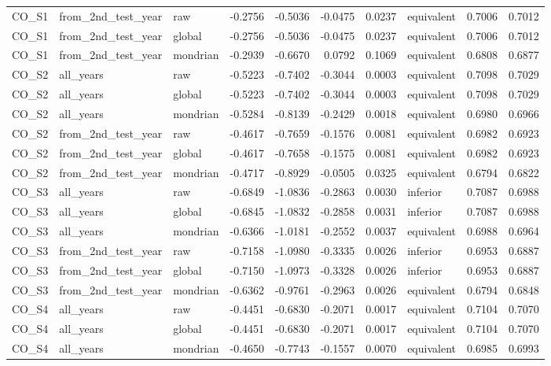\begin{tabular}{lllrrrrlrr}
CO\_S1 & from\_2nd\_test\_year & raw & -0.2756 & -0.5036 & -0.0475 & 0.0237 & equivalent & 0.7006 & 0.7012 \\
CO\_S1 & from\_2nd\_test\_year & global & -0.2756 & -0.5036 & -0.0475 & 0.0237 & equivalent & 0.7006 & 0.7012 \\
CO\_S1 & from\_2nd\_test\_year & mondrian & -0.2939 & -0.6670 & 0.0792 & 0.1069 & equivalent & 0.6808 & 0.6877 \\
CO\_S2 & all\_years & raw & -0.5223 & -0.7402 & -0.3044 & 0.0003 & equivalent & 0.7098 & 0.7029 \\
CO\_S2 & all\_years & global & -0.5223 & -0.7402 & -0.3044 & 0.0003 & equivalent & 0.7098 & 0.7029 \\
CO\_S2 & all\_years & mondrian & -0.5284 & -0.8139 & -0.2429 & 0.0018 & equivalent & 0.6980 & 0.6966 \\
CO\_S2 & from\_2nd\_test\_year & raw & -0.4617 & -0.7659 & -0.1576 & 0.0081 & equivalent & 0.6982 & 0.6923 \\
CO\_S2 & from\_2nd\_test\_year & global & -0.4617 & -0.7658 & -0.1575 & 0.0081 & equivalent & 0.6982 & 0.6923 \\
CO\_S2 & from\_2nd\_test\_year & mondrian & -0.4717 & -0.8929 & -0.0505 & 0.0325 & equivalent & 0.6794 & 0.6822 \\
CO\_S3 & all\_years & raw & -0.6849 & -1.0836 & -0.2863 & 0.0030 & inferior & 0.7087 & 0.6988 \\
CO\_S3 & all\_years & global & -0.6845 & -1.0832 & -0.2858 & 0.0031 & inferior & 0.7087 & 0.6988 \\
CO\_S3 & all\_years & mondrian & -0.6366 & -1.0181 & -0.2552 & 0.0037 & equivalent & 0.6988 & 0.6964 \\
CO\_S3 & from\_2nd\_test\_year & raw & -0.7158 & -1.0980 & -0.3335 & 0.0026 & inferior & 0.6953 & 0.6887 \\
CO\_S3 & from\_2nd\_test\_year & global & -0.7150 & -1.0973 & -0.3328 & 0.0026 & inferior & 0.6953 & 0.6887 \\
CO\_S3 & from\_2nd\_test\_year & mondrian & -0.6362 & -0.9761 & -0.2963 & 0.0026 & equivalent & 0.6794 & 0.6848 \\
CO\_S4 & all\_years & raw & -0.4451 & -0.6830 & -0.2071 & 0.0017 & equivalent & 0.7104 & 0.7070 \\
CO\_S4 & all\_years & global & -0.4451 & -0.6830 & -0.2071 & 0.0017 & equivalent & 0.7104 & 0.7070 \\
CO\_S4 & all\_years & mondrian & -0.4650 & -0.7743 & -0.1557 & 0.0070 & equivalent & 0.6985 & 0.6993 \\

\end{tabular}

